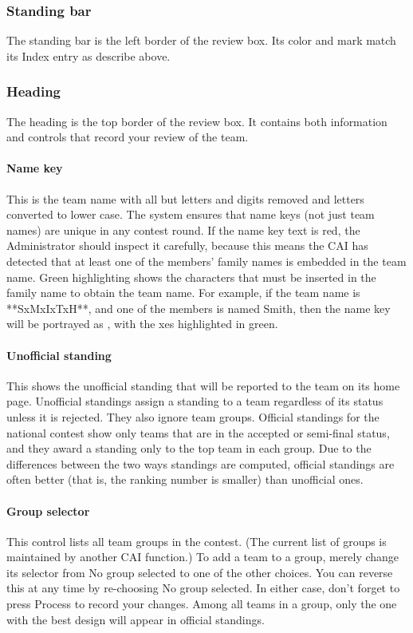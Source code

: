 \documentclass[11pt,letterpaper]{refart}
\def\ui#1{\textsf{#1}}
\begin{document}
\subsubsection{Standing bar}
The standing bar is the left border of the review box. Its color and mark match
its Index entry as describe above. 

\subsubsection{Heading}
\label{sec:heading}
The heading is the top border of the review box. It contains both information
and controls that record your review of the team. 

\paragraph{Name key}
This is the team name
with all but letters and digits removed and letters converted to lower case. The
system ensures that name keys (not just team names) are unique in any contest 
round. If the name key text is red, the Administrator
should inspect it carefully, because this means the CAI has detected that at
least one of the members' family names is embedded in the team name. Green
highlighting shows the characters that must be inserted in the family name to
obtain the team name. For example, if the team name is \ui{**SxMxIxTxH**}, and
one of the members is named Smith, then the name key will be portrayed as
\ui{\color{red}{sxmxixtxh}}, with the \ui{x}es highlighted in green.

\paragraph{Unofficial standing}
This shows the unofficial standing that will be reported to the team on its home
page. Unofficial standings assign a standing to a team regardless of its status 
unless it is rejected. They also ignore team groups. Official standings for 
the national contest show only teams
that are in the accepted or semi-final status, and they award a standing only to
the top team in each group. Due to the differences between the two ways 
standings are computed, official standings are often better (that is, the ranking 
number is smaller) than unofficial ones.

\paragraph{Group selector}
This control lists all team groups in the contest. (The current list
of groups is maintained by another CAI function.)
To add a team to a group, merely 
change its selector from \ui{No group selected} to one of the other choices. You 
can reverse this at any time by re-choosing \ui{No group selected}. In either case,
don't forget to press \ui{Process} to record your changes. Among all teams
in a group, only the one with the best design will appear in official standings.
\end{document}
